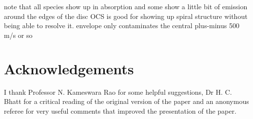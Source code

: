 \documentclass[useAMS,usenatbib]{mn2e}
\begin{document}
note that all species show up in absorption and some show a little bit of emission around the edges of the disc
OCS is good for showing up spiral structure without being able to resolve it.
envelope only contaminates the central plus-minus 500 m/s or so


\section*{Acknowledgements}

I thank Professor N. Kameswara Rao for some helpful suggestions,
Dr H. C. Bhatt for a critical reading of the original version of the
paper and an anonymous referee for very useful comments that improved
the presentation of the paper.


%
%
%
%
\end{document}
